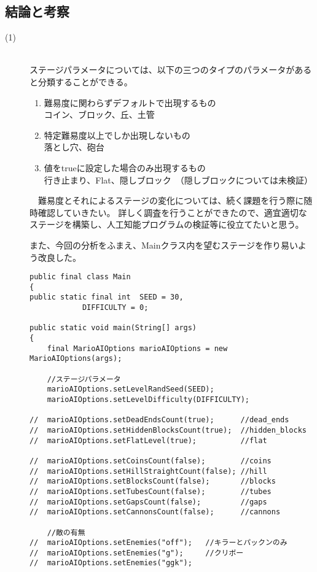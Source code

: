\documentclass[a4j]{jarticle}
\begin{document}
\subsection{結論と考察}
\begin{description}
\item[(1)]~\\
ステージパラメータについては、以下の三つのタイプのパラメータがあると分類することができる。
\begin{enumerate}
\item 難易度に関わらずデフォルトで出現するもの ~\\
コイン、ブロック、丘、土管
\item 特定難易度以上でしか出現しないもの~\\
落とし穴、砲台
\item 値をtrueに設定した場合のみ出現するもの~\\
行き止まり、Flat、隠しブロック　（隠しブロックについては未検証）
\end{enumerate}

　難易度とそれによるステージの変化については、続く課題を行う際に随時確認していきたい。
詳しく調査を行うことができたので、適宜適切なステージを構築し、人工知能プログラムの検証等に役立てたいと思う。

また、今回の分析をふまえ、Mainクラス内を望むステージを作り易いよう改良した。
\begin{verbatim}
public final class Main
{
public static final int  SEED = 30,
		  	DIFFICULTY = 0;

public static void main(String[] args)
{
    final MarioAIOptions marioAIOptions = new MarioAIOptions(args);
 
    //ステージパラメータ
    marioAIOptions.setLevelRandSeed(SEED);
    marioAIOptions.setLevelDifficulty(DIFFICULTY);

//  marioAIOptions.setDeadEndsCount(true);		//dead_ends
//  marioAIOptions.setHiddenBlocksCount(true);	//hidden_blocks
//  marioAIOptions.setFlatLevel(true);			//flat
   
//  marioAIOptions.setCoinsCount(false);		//coins
//  marioAIOptions.setHillStraightCount(false);	//hill
//  marioAIOptions.setBlocksCount(false);		//blocks
//  marioAIOptions.setTubesCount(false);		//tubes
//  marioAIOptions.setGapsCount(false); 		//gaps
//  marioAIOptions.setCannonsCount(false);		//cannons
    
    //敵の有無  
//  marioAIOptions.setEnemies("off");	//キラーとパックンのみ
//  marioAIOptions.setEnemies("g"); 	//クリボー
//  marioAIOptions.setEnemies("ggk");
    

\end{verbatim}
\end{description}
\end{document}

